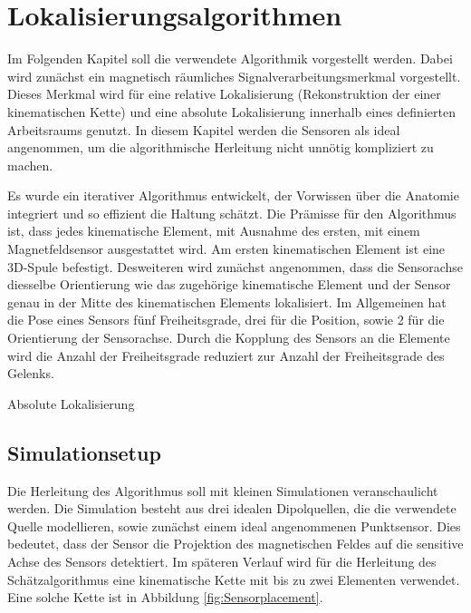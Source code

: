 \chapter{Lokalisierungsalgorithmen}
\label{chap:char_localization}
Im Folgenden Kapitel soll die verwendete Algorithmik vorgestellt werden. Dabei wird zunächst ein magnetisch räumliches Signalverarbeitungsmerkmal vorgestellt. Dieses Merkmal wird für eine relative Lokalisierung (Rekonstruktion der einer kinematischen Kette) und eine absolute Lokalisierung innerhalb eines definierten Arbeitsraums genutzt. In diesem Kapitel werden die Sensoren als ideal angenommen, um die algorithmische Herleitung nicht unnötig kompliziert zu machen. 

Es wurde ein iterativer Algorithmus entwickelt, der Vorwissen über die Anatomie integriert und so effizient die Haltung schätzt. Die Prämisse für den Algorithmus ist, dass jedes kinematische Element, mit Ausnahme des ersten, mit einem Magnetfeldsensor ausgestattet wird. Am ersten kinematischen Element ist eine 3D-Spule befestigt. Desweiteren wird zunächst angenommen, dass die Sensorachse diesselbe Orientierung wie das zugehörige kinematische Element und der Sensor genau in der Mitte des kinematischen Elements lokalisiert. Im Allgemeinen hat die Pose eines Sensors fünf Freiheitsgrade, drei für die Position, sowie 2 für die Orientierung der Sensorachse. Durch die Kopplung des Sensors an die Elemente wird die Anzahl der Freiheitsgrade reduziert zur Anzahl der Freiheitsgrade des Gelenks.

Absolute Lokalisierung

\section{Simulationsetup}
Die Herleitung des Algorithmus soll mit kleinen Simulationen veranschaulicht werden. Die Simulation besteht aus drei idealen Dipolquellen, die die verwendete Quelle modellieren, sowie zunächst einem ideal angenommenen Punktsensor. Dies bedeutet, dass der Sensor die Projektion des magnetischen Feldes auf die sensitive Achse des Sensors detektiert. Im späteren Verlauf wird für die Herleitung des Schätzalgorithmus eine kinematische Kette mit bis zu zwei Elementen verwendet. Eine solche Kette ist in Abbildung \ref{fig:Sensorplacement}.

